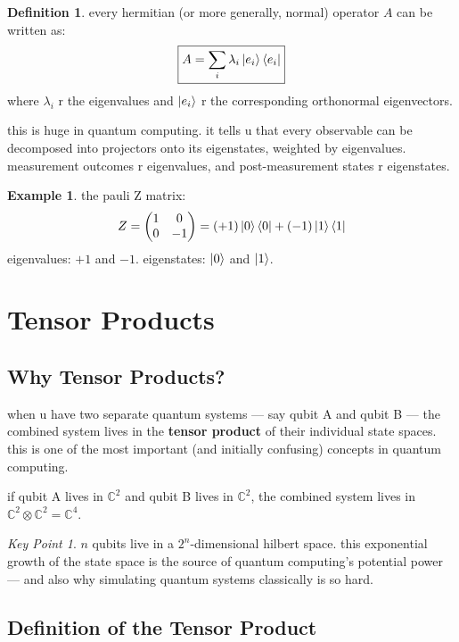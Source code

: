 \documentclass[11pt,a4paper]{article}
\theoremstyle{definition}
\newtheorem{definition}{Definition}[section]
\newtheorem{example}{Example}[section]
\theoremstyle{remark}
\newtheorem*{keypoint}{Key Point}
\begin{document}
\begin{definition}
every hermitian (or more generally, normal) operator $A$ can be written as:
\[
\boxed{A = \sum_i \lambda_i \ket{e_i}\bra{e_i}}
\]
where $\lambda_i$ r the eigenvalues and $\ket{e_i}$ r the corresponding orthonormal eigenvectors.
\end{definition}

this is huge in quantum computing. it tells u that every observable can be decomposed into projectors onto its eigenstates, weighted by eigenvalues. measurement outcomes r eigenvalues, and post-measurement states r eigenstates.

\begin{example}
the pauli Z matrix:
\[
Z = \begin{pmatrix} 1 & 0 \\ 0 & -1 \end{pmatrix} = (+1)\ket{0}\bra{0} + (-1)\ket{1}\bra{1}
\]
eigenvalues: $+1$ and $-1$. eigenstates: $\ket{0}$ and $\ket{1}$.
\end{example}

\section{Tensor Products}

\subsection{Why Tensor Products?}

when u have two separate quantum systems --- say qubit A and qubit B --- the combined system lives in the \textbf{tensor product} of their individual state spaces. this is one of the most important (and initially confusing) concepts in quantum computing.

if qubit A lives in $\mathbb{C}^2$ and qubit B lives in $\mathbb{C}^2$, the combined system lives in $\mathbb{C}^2 \otimes \mathbb{C}^2 = \mathbb{C}^4$.

\begin{keypoint}
$n$ qubits live in a $2^n$-dimensional hilbert space. this exponential growth of the state space is the source of quantum computing's potential power --- and also why simulating quantum systems classically is so hard.
\end{keypoint}

\subsection{Definition of the Tensor Product}
\end{document}
